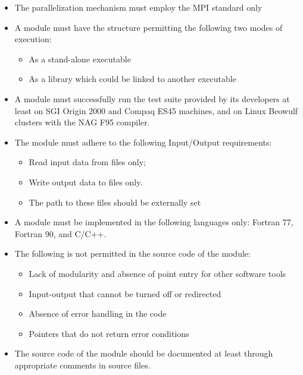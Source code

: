 \begin{itemize}
\item The parallelization mechanism must employ the MPI standard only
\item A module must have the structure permitting the following two 
      modes of execution:

   \begin{itemize}
   \item As a stand-alone executable
   \item As a library which could be linked to another executable
   \end{itemize}

\item A module must successfully run the test suite provided by its
developers at least  on SGI Origin 2000 and
Compaq ES45 machines, and
on Linux Beowulf clusters with the NAG F95 compiler.

\item The module must adhere to the following Input/Output requirements:

    \begin{itemize}
    \item Read input data from files only;
    \item Write output data to files only.
    \item The path to these files should be externally set
    \end{itemize}

\item A module must be implemented in the following languages only: Fortran 77, Fortran 90, and C/C++.

\item The following is not permitted in the source code of the module:

    \begin{itemize}
    \item Lack of modularity and absence of point entry 
          for other software tools
    \item Input-output that cannot be turned off or redirected
    \item Absence of error handling in the code
    \item Pointers that do not return error conditions
\end{itemize}

\item The source code of the module should be documented 
      at least through appropriate comments in source files.
\end{itemize}

